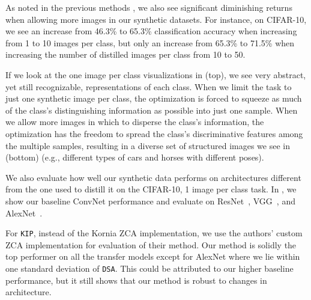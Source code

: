 As noted in the previous methods \citep{dd}, we also see significant diminishing returns when allowing more images in our synthetic datasets. For instance, on CIFAR-10, we see an increase from 46.3\% to 65.3\% classification accuracy when increasing from 1 to 10 images per class, but only an increase from 65.3\% to 71.5\% when increasing the number of distilled images per class from 10 to 50.

If we look at the one image per class visualizations in  (top), we see very abstract, yet still recognizable, representations of each class. When we limit the task to just one synthetic image per class, the optimization is forced to squeeze as much of the class's distinguishing information as possible into just one sample. When we allow more images in which to disperse the class's information, the optimization has the freedom to spread the class's discriminative features among the multiple samples, resulting in a diverse set of structured images we see in  (bottom) (e.g., different types of cars and horses with different poses).



We also evaluate how well our synthetic data performs on architectures different from the one used to distill it on the CIFAR-10, 1 image per class task. In , we show our baseline \linebreak ConvNet performance and evaluate on ResNet~\cite{resnet}, VGG~\cite{vgg}, and AlexNet~\cite{alexnet}. 
 
For \texttt{KIP}, instead of the Kornia \cite{kornia} ZCA implementation, we use the authors' custom ZCA implementation for evaluation of their method. Our method is solidly the top performer on all the transfer models except for AlexNet where we lie within one standard deviation of \texttt{DSA}. This could be attributed to our higher baseline performance, but it still shows that our method is robust to changes in architecture.

